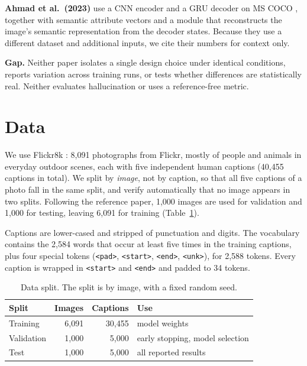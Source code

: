 \documentclass[11pt]{article}
\newcommand{\tbl}[2]{\caption{#1}{\sffamily\small #2}}
\begin{document}
\textbf{Ahmad et al.\ (2023)} \cite{ahmad2023} use a CNN encoder and a GRU decoder on MS COCO \cite{lin2014coco}, together with semantic attribute vectors \cite{yao2017} and a module that reconstructs the image's semantic representation from the decoder states. Because they use a different dataset and additional inputs, we cite their numbers for context only.

\textbf{Gap.} Neither paper isolates a single design choice under identical conditions, reports variation across training runs, or tests whether differences are statistically real. Neither evaluates hallucination or uses a reference-free metric.

\section{Data}\label{sec:data}

We use Flickr8k \cite{hodosh2013}: 8,091 photographs from Flickr, mostly of people and animals in everyday outdoor scenes, each with five independent human captions (40,455 captions in total). We split by \emph{image}, not by caption, so that all five captions of a photo fall in the same split, and verify automatically that no image appears in two splits. Following the reference paper, 1,000 images are used for validation and 1,000 for testing, leaving 6,091 for training (Table~\ref{tab:data}).

Captions are lower-cased and stripped of punctuation and digits. The vocabulary contains the 2,584 words that occur at least five times in the training captions, plus four special tokens (\texttt{<pad>}, \texttt{<start>}, \texttt{<end>}, \texttt{<unk>}), for 2,588 tokens. Every caption is wrapped in \texttt{<start>} and \texttt{<end>} and padded to 34 tokens.

\begin{table}[tbp]\centering
\tbl{Data split. The split is by image, with a fixed random seed.}
{\begin{tabular}{@{}lrrp{3.2cm}@{}}\toprule
Split & Images & Captions & Use \\\midrule
Training & 6,091 & 30,455 & model weights \\
Validation & 1,000 & 5,000 & early stopping, model selection \\
Test & 1,000 & 5,000 & all reported results \\\bottomrule
\end{tabular}}
\label{tab:data}
\end{table}
\end{document}
